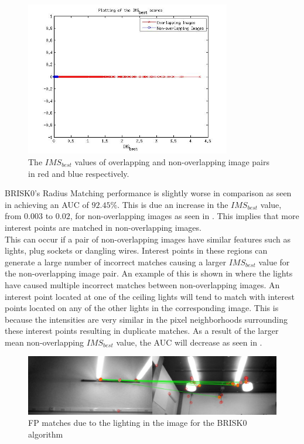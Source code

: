 \begin{figure}
  \centering
    \includegraphics[width=0.8\textwidth]{../Drawings/Matching/MatchingScore_BRISK0.jpg}
    \caption{The $IMS_{best}$ values of overlapping and non-overlapping image pairs in red and blue respectively.} 
    \label{fig:ms_brisk0}
\end{figure}

BRISK0's Radius Matching performance is slightly worse in comparison as seen in  achieving an AUC of $92.45\%$. This is due an increase in the $IMS_{best}$ value, from $0.003$ to $0.02$, for non-overlapping images as seen in . This implies that more interest points are matched in non-overlapping images.\\

This can occur if a pair of non-overlapping images have similar features such as lights, plug sockets or dangling wires. Interest points in these regions can generate a large number of incorrect matches causing a larger $IMS_{best}$ value for the non-overlapping image pair. An example of this is shown in  where the lights have caused multiple incorrect matches between non-overlapping images. An interest point located at one of the ceiling lights will tend to match with interest points located on any of the other lights in the corresponding image. This is because the intensities are very similar in the pixel neighborhoods surrounding these interest points resulting in duplicate matches. As a result of the larger mean non-overlapping $IMS_{best}$ value, the AUC will decrease as seen in .\\

\begin{figure}
  \centering
    \includegraphics[width=1.0\textwidth]{../Drawings/Matching/fpMatchBRISK0.jpg}
    \caption{FP matches due to the lighting in the image for the BRISK0 algorithm} 
    \label{fig:duplicateMatchesBrisk0}
\end{figure}

